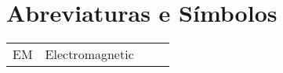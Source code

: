 \chapter*{Abreviaturas e Símbolos}
\usepackage[utf8]{inputenc}
\begin{flushleft}
\begin{tabular}{l p{0.8\linewidth}}
EM       & Electromagnetic\\
\end{tabular}
\end{flushleft}

